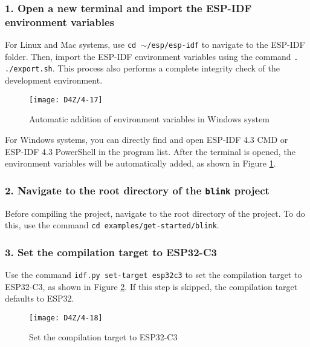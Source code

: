 \documentclass[a4paper,12pt]{book}
\begin{document}
\subsubsection{1. Open a new terminal and import the ESP-IDF environment variables}
For Linux and Mac systems, use \texttt{cd $\sim$/esp/esp-idf} to navigate to the ESP-IDF folder. Then, import the ESP-IDF environment variables using the command \verb|. ./export.sh|. This process also performs a complete integrity check of the development environment.


\begin{figure}[h!]
    \Centering
    \texttt{[image: D4Z/4-17]}
    \caption{Automatic addition of environment variables in Windows system}
    \label{Automatic addition of environment variables in Windows system}
\end{figure}

For Windows systems, you can directly find and open ESP-IDF 4.3 CMD or ESP-IDF 4.3 PowerShell in the program list. After the terminal is opened, the environment variables will be automatically added, as shown in Figure \ref{Automatic addition of environment variables in Windows system}.

\subsubsection{2. Navigate to the root directory of the \texttt{blink} project}
Before compiling the project, navigate to the root directory of the project. To do this, use the command \verb|cd examples/get-started/blink|.

\subsubsection{3. Set the compilation target to ESP32-C3}
Use the command \verb|idf.py set-target esp32c3| to set the compilation target to ESP32-C3, as shown in Figure \ref{Set the compilation target to ESP32-C3}. If this step is skipped, the compilation target defaults to ESP32.

\begin{figure}[h!]
    \Centering
    \texttt{[image: D4Z/4-18]}
    \caption{Set the compilation target to ESP32-C3}
    \label{Set the compilation target to ESP32-C3}
\end{figure}
\end{document}
